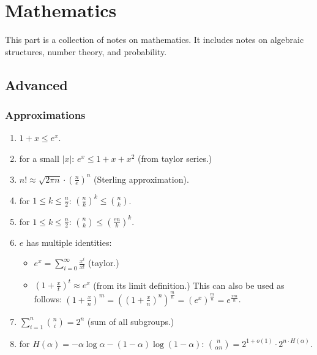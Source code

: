 \part{Mathematics}
This part is a collection of notes on mathematics.
It includes notes on algebraic structures, number theory, and probability. 









\chapter{Advanced}
\section{Approximations}
\begin{enumerate}
    \item $1+x \le e^x$.
    \item for a small $|x|$: $e^x \le 1+x+x^2$ (from taylor series.)
    \item $n! \approx \sqrt{2\pi n} \cdot \left( \frac{n}{e}\right)^n$ (Sterling approximation).
    \item for $1\le k \le \frac{n}{2}$: $\left( \frac{n}{k}\right)^k \le \binom{n}{k}$.
    \item for $1\le k \le \frac{n}{2}$: $\binom{n}{k}\le\left(\frac{en}{k}\right)^{k}$.
    \item $e$ has multiple identities:
        \begin{itemize} 
          \item $e^{x}=\sum\limits _{i=0}^{\infty}\frac{x^{i}}{x!}$ (taylor.)
          \item $\left(1+\frac{x}{t}\right)^{t}\approx e^{x}$ (from its limit definition.) 
          This can also be used as follows: $\left(1+\frac{x}{n}\right)^{m}=\left(\left(1+\frac{x}{n}\right)^{n}\right)^{\frac{m}{n}}=\left(e^{x}\right)^{\frac{m}{n}}=e^{\frac{xm}{n}}$.
        \end{itemize}
    \item $\sum_{i=1}^{n}\binom{n}{i}=2^{n}$ (sum of all subgroups.)
    \item for $H\left(\alpha\right)=-\alpha\log\alpha-\left(1-\alpha\right)\log\left(1-\alpha\right)$: $\binom{n}{\alpha n}=2^{1+o\left(1\right)}\cdot2^{n\cdot H\left(\alpha\right)}$.
\end{enumerate}
